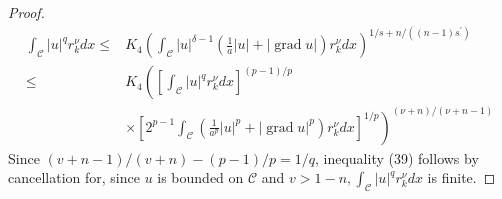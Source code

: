 \begin{proof}
  \[
  \begin{aligned}
  \int_{\mathcal{C}}|u|^q r_k^\nu d x \leq & K_4\left(\int_{\mathcal{C}}|u|^{\delta-1}\left(\frac{1}{a}|u|+|\operatorname{grad} u|\right) r_k^\nu d x\right)^{1 / s+n /\left((n-1) s^{\prime}\right)} \\
  \leq & K_4\left(\left[\int_{\mathcal{C}}|u|^q r_k^\nu d x\right]^{(p-1) / p}\right. \\
  & \left.\times\left[2^{p-1} \int_{\mathcal{C}}\left(\frac{1}{a^p}|u|^p+|\operatorname{grad} u|^p\right) r_k^\nu d x\right]^{1 / p}\right)^{(\nu+n) /(\nu+n-1)}
  \end{aligned}
  \]
  Since $(v+n-1) /(v+n)-(p-1) / p=1 / q$, inequality (39) follows by cancellation for, since $u$ is bounded on $\mathcal{C}$ and $v>1-n, \int_{\mathcal{C}}|u|^q r_k^\nu d x$ is finite.
\end{proof}


